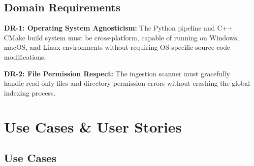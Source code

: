 \documentclass[12pt, a4paper]{article}
\begin{document}
\subsection{Domain Requirements}
\begin{tcolorbox}[standardbox, colback=white, colframe=ctPurple, leftrule=4pt]
\begin{prolist}
    \item \textbf{DR-1: Operating System Agnosticism:} The Python pipeline and C++ CMake build system must be cross-platform, capable of running on Windows, macOS, and Linux environments without requiring OS-specific source code modifications.
    \item \textbf{DR-2: File Permission Respect:} The ingestion scanner must gracefully handle read-only files and directory permission errors without crashing the global indexing process.
\end{prolist}
\end{tcolorbox}

\section{Use Cases \& User Stories}

\subsection{Use Cases}
\end{document}
